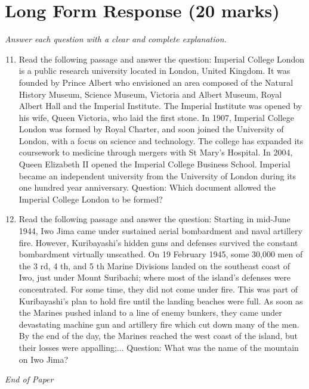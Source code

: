 \documentclass[12pt]{article}
\begin{document}
\section*{Long Form Response (20 marks)}
\textit{Answer each question with a clear and complete explanation.}
\begin{enumerate}[label=\arabic*.]
\setcounter{enumi}{10}
\item Read the following passage and answer the question: Imperial College London is a public research university located in London, United Kingdom. It was founded by Prince Albert who envisioned an area composed of the Natural History Museum, Science Museum, Victoria and Albert Museum, Royal Albert Hall and the Imperial Institute. The Imperial Institute was opened by his wife, Queen Victoria, who laid the first stone. In 1907, Imperial College London was formed by Royal Charter, and soon joined the University of London, with a focus on science and technology. The college has expanded its coursework to medicine through mergers with St Mary's Hospital. In 2004, Queen Elizabeth II opened the Imperial College Business School. Imperial became an independent university from the University of London during its one hundred year anniversary. Question: Which document allowed the Imperial College London to be formed?
\item Read the following passage and answer the question: Starting in mid-June 1944, Iwo Jima came under sustained aerial bombardment and naval artillery fire. However, Kuribayashi's hidden guns and defenses survived the constant bombardment virtually unscathed. On 19 February 1945, some 30,000 men of the 3 rd, 4 th, and 5 th Marine Divisions landed on the southeast coast of Iwo, just under Mount Suribachi; where most of the island's defenses were concentrated. For some time, they did not come under fire. This was part of Kuribayashi's plan to hold fire until the landing beaches were full. As soon as the Marines pushed inland to a line of enemy bunkers, they came under devastating machine gun and artillery fire which cut down many of the men. By the end of the day, the Marines reached the west coast of the island, but their losses were appalling;... Question: What was the name of the mountain on Iwo Jima?
\end{enumerate}

\vfill
\noindent\textit{End of Paper}
\end{document}

